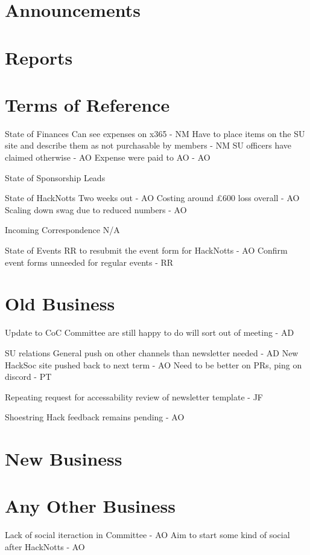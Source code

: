\documentclass[11pt,hacksoc]{meetingmins}
\begin{document}
\maketitle

\section{Announcements}

\section{Reports}


\section{Terms of Reference}
\begin{items}
\item {State of Finances}
\subitem Can see expenses on x365 - NM
\subitem Have to place items on the SU site and describe them as not purchasable by members - NM
\subsubitem SU officers have claimed otherwise - AO
\subitem Expense were paid to AO - AO
\item {State of Sponsorship Leads}
\item {State of HackNotts}
\subitem Two weeks out - AO
\subitem Costing around £600 loss overall - AO
\subitem Scaling down swag due to reduced numbers - AO
\item {Incoming Correspondence}
\subitem N/A
\item {State of Events}
\subitem RR to resubmit the event form for HackNotts - AO
\subitem Confirm event forms unneeded for regular events - RR
\end{items}

\section{Old Business}
\begin{items}
\item Update to CoC 
\subitem Committee are still happy to do will sort out of meeting - AD
\item SU relations
\subitem General push on other channels than newsletter needed - AD
\subitem New HackSoc site pushed back to next term - AO
\subitem Need to be better on PRs, ping on discord - PT
\item Repeating request for accessability review of newsletter template - JF
\item Shoestring Hack feedback remains pending - AO
\end{items}

\section{New Business}

\section{Any Other Business}
\begin{items}
\item Lack of social iteraction in Committee - AO
\subitem Aim to start some kind of social after HackNotts - AO
\end{items}

\vspace{1em}
\nextmeeting{}
\end{document}
